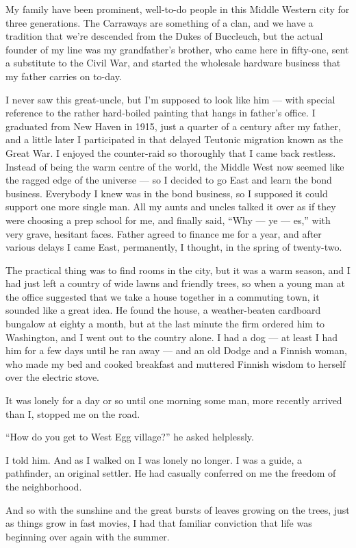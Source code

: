 \documentclass{znotebook}
\begin{document}
My family have been prominent, well-to-do people in this Middle Western city for three generations. The Carraways are something of a clan, and we have a tradition that we’re descended from the Dukes of Buccleuch, but the actual founder of my line was my grandfather’s brother, who came here in fifty-one, sent a substitute to the Civil War, and started the wholesale hardware business that my father carries on to-day.

I never saw this great-uncle, but I’m supposed to look like him — with special reference to the rather hard-boiled painting that hangs in father’s office. I graduated from New Haven in 1915, just a quarter of a century after my father, and a little later I participated in that delayed Teutonic migration known as the Great War. I enjoyed the counter-raid so thoroughly that I came back restless. Instead of being the warm centre of the world, the Middle West now seemed like the ragged edge of the universe — so I decided to go East and learn the bond business. Everybody I knew was in the bond business, so I supposed it could support one more single man. All my aunts and uncles talked it over as if they were choosing a prep school for me, and finally said, ``Why — ye — es,'' with very grave, hesitant faces. Father agreed to finance me for a year, and after various delays I came East, permanently, I thought, in the spring of twenty-two.

The practical thing was to find rooms in the city, but it was a warm season, and I had just left a country of wide lawns and friendly trees, so when a young man at the office suggested that we take a house together in a commuting town, it sounded like a great idea. He found the house, a weather-beaten cardboard bungalow at eighty a month, but at the last minute the firm ordered him to Washington, and I went out to the country alone. I had a dog — at least I had him for a few days until he ran away — and an old Dodge and a Finnish woman, who made my bed and cooked breakfast and muttered Finnish wisdom to herself over the electric stove.

It was lonely for a day or so until one morning some man, more recently arrived than I, stopped me on the road.

``How do you get to West Egg village?'' he asked helplessly.

I told him. And as I walked on I was lonely no longer. I was a guide, a pathfinder, an original settler. He had casually conferred on me the freedom of the neighborhood.

And so with the sunshine and the great bursts of leaves growing on the trees, just as things grow in fast movies, I had that familiar conviction that life was beginning over again with the summer.
\end{document}
